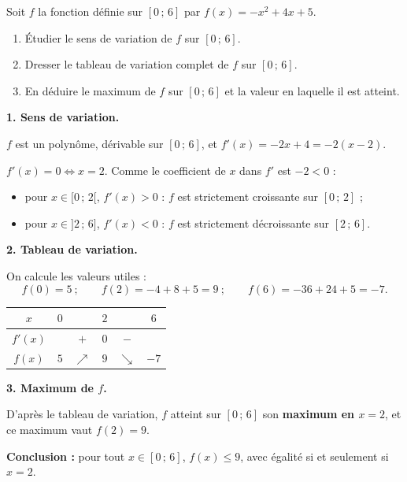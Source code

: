 \documentclass[11pt]{article}
\begin{document}
\begin{exoresolu}
Soit $f$ la fonction définie sur $[0\,;\,6]$ par $f(x) = -x^2 + 4x + 5$.
\begin{enumerate}
\item Étudier le sens de variation de $f$ sur $[0\,;\,6]$.
\item Dresser le tableau de variation complet de $f$ sur $[0\,;\,6]$.
\item En déduire le maximum de $f$ sur $[0\,;\,6]$ et la valeur en laquelle il est atteint.
\end{enumerate}
\tcblower
\textbf{1. Sens de variation.}

$f$ est un polynôme, dérivable sur $[0\,;\,6]$, et $f'(x) = -2x + 4 = -2(x-2)$.

$f'(x) = 0 \iff x = 2$. Comme le coefficient de $x$ dans $f'$ est $-2 < 0$ :
\begin{itemize}
\item pour $x \in [0\,;\,2[$, $f'(x) > 0$ : $f$ est strictement croissante sur $[0\,;\,2]$ ;
\item pour $x \in ]2\,;\,6]$, $f'(x) < 0$ : $f$ est strictement décroissante sur $[2\,;\,6]$.
\end{itemize}

\textbf{2. Tableau de variation.}

On calcule les valeurs utiles :
\[ f(0) = 5 \ ; \qquad f(2) = -4 + 8 + 5 = 9 \ ; \qquad f(6) = -36 + 24 + 5 = -7. \]

\begin{center}
\begin{tabular}{|c|ccccc|}
\hline
$x$ & $0$ & & $2$ & & $6$ \\
\hline
$f'(x)$ & & $+$ & $0$ & $-$ & \\
\hline
$f(x)$ & $5$ & $\nearrow$ & $9$ & $\searrow$ & $-7$ \\
\hline
\end{tabular}
\end{center}

\textbf{3. Maximum de $f$.}

D'après le tableau de variation, $f$ atteint sur $[0\,;\,6]$ son \textbf{maximum en $x = 2$}, et ce maximum vaut $f(2) = 9$.

\textbf{Conclusion :} pour tout $x \in [0\,;\,6]$, $f(x) \leq 9$, avec égalité si et seulement si $x = 2$.
\end{exoresolu}
\end{document}
